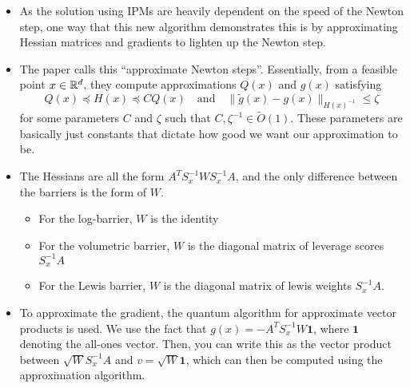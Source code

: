 \documentclass[10pt]{article}
\renewcommand{\tilde}{\widetilde}
\begin{document}
	\begin{itemize}
		\item As the solution using IPMs are heavily dependent on the speed of the Newton step, one way that 
			this new algorithm demonstrates this is by approximating Hessian matrices and gradients to lighten up 
			the Newton step. 
		\item The paper calls this ``approximate Newton steps''. Essentially, from a feasible point 
			\( x \in \mathbb R^{d} \), they compute approximations \( Q(x) \) and \( g(x) \) satisfying
			\[
				Q(x) \preceq H(x) \preceq C Q(x) \quad \text{and} \quad \|\tilde g(x) - g(x)\|_{H(x)^{-1}} \le \zeta
			\] 
			for some parameters \( C \) and \( \zeta \) such that \( C, \zeta^{-1} \in \tilde O(1) \). These 
			parameters are basically just constants that dictate how good we want our approximation to be.      

		 \item The Hessians are all the form \( A^{T} S_x^{-1} W S_x^{-1} A \), and the only difference between the 
			 barriers is the form of \( W \). 
			 \begin{itemize}
			 	\item For the log-barrier, \( W \) is the identity
				\item For the volumetric barrier, \( W \) is the diagonal matrix of leverage scores \( S_x^{-1} A \) 
				\item For the Lewis barrier, \( W \) is the diagonal matrix of lewis weights \( S_x^{-1}A \). 
			 \end{itemize}
		 \item To approximate the gradient, the quantum algorithm for approximate vector products is used. We use 
			 the fact that \( g(x) = -A^{T} S_x^{-1} W \mathbf 1 \), where \( \mathbf 1 \) denoting the
			 all-ones vector. Then, you can write this as the vector product between \( \sqrt{W} S_x^{-1} A \) 
			 and \( v = \sqrt{W}\mathbf 1  \), which can then be computed using the approximation algorithm. 
	\end{itemize}
\end{document}
